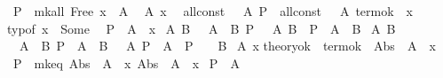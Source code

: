 {\begin{isabelle}
\isaindent{\ \ \ \ }{\isasymLongrightarrow}\ P\ {\isasymGamma}\ {\isacharparenleft}mk{\isacharunderscore}all\ {\isacharparenleft}Free\ x\ {\isasymtau}{\isacharparenright}\ A{\isacharparenright}{\isacharsemicolon}\isanewline
\isaindent{\ }{\isasymAnd}{\isasymGamma}\ {\isasymtau}\ A\ x{\isachardot}\isanewline
\isaindent{\ \ \ \ }{\isasymlbrakk}{\isasymTheta}{\isacharcomma}{\isasymGamma}\ {\isasymturnstile}\ all{\isacharunderscore}const\ {\isasymtau}\ {\isachardollar}\ A{\isacharsemicolon}\ P\ {\isasymGamma}\ {\isacharparenleft}all{\isacharunderscore}const\ {\isasymtau}\ {\isachardollar}\ A{\isacharparenright}{\isacharsemicolon}\ term{\isacharunderscore}ok\ {\isasymTheta}\ x{\isacharsemicolon}\isanewline
\isaindent{\ \ \ \ \ }typ{\isacharunderscore}of\ x\ {\isacharequal}\ Some\ {\isasymtau}{\isasymrbrakk}\isanewline
\isaindent{\ \ \ \ }{\isasymLongrightarrow}\ P\ {\isasymGamma}\ {\isacharparenleft}A\ {\isasymbullet}\ x{\isacharparenright}{\isacharsemicolon}\isanewline
\isaindent{\ }{\isasymAnd}{\isasymGamma}\ A\ B{\isachardot}\ {\isasymlbrakk}{\isasymTheta}{\isacharcomma}{\isasymGamma}\ {\isasymunion}\ {\isacharbraceleft}A{\isacharbraceright}\ {\isasymturnstile}\ B{\isacharsemicolon}\ P\ {\isacharparenleft}{\isasymGamma}\ {\isasymunion}\ {\isacharbraceleft}A{\isacharbraceright}{\isacharparenright}\ B{\isasymrbrakk}\ {\isasymLongrightarrow}\ P\ {\isasymGamma}\ {\isacharparenleft}A\ {\isasymlongmapsto}\ B{\isacharparenright}{\isacharsemicolon}\isanewline
\isaindent{\ }{\isasymAnd}{\isasymGamma}\ A\ B\ {\isasymGamma}\isanewline
\isaindent{\ \ \ \ }{\isasymlbrakk}{\isasymTheta}{\isacharcomma}{\isasymGamma}\ {\isasymturnstile}\ A\ {\isasymlongmapsto}\ B{\isacharsemicolon}\ P\ {\isasymGamma}\ {\isacharparenleft}A\ {\isasymlongmapsto}\ B{\isacharparenright}{\isacharsemicolon}\ {\isasymTheta}{\isacharcomma}{\isasymGamma}\ {\isasymturnstile}\ A{\isacharsemicolon}\ P\ {\isasymGamma}\ A{\isasymrbrakk}\ {\isasymLongrightarrow}\ P\ {\isacharparenleft}{\isasymGamma}\ {\isasymunion}\ {\isasymGamma}\ B{\isacharsemicolon}\isanewline
\isaindent{\ }{\isasymAnd}{\isasymtau}\ A\ x{\isachardot}\isanewline
\isaindent{\ \ \ \ }{\isasymlbrakk}theory{\isacharunderscore}ok\ {\isasymTheta}{\isacharsemicolon}\ term{\isacharunderscore}ok\ {\isasymTheta}\ {\isacharparenleft}Abs\ {\isasymtau}\ A\ {\isachardollar}\ x{\isacharparenright}{\isasymrbrakk}\isanewline
\isaindent{\ \ \ \ }{\isasymLongrightarrow}\ P\ {\isasymemptyset}\ {\isacharparenleft}mk{\isacharunderscore}eq\ {\isacharparenleft}Abs\ {\isasymtau}\ A\ {\isachardollar}\ x{\isacharparenright}\ {\isacharparenleft}Abs\ {\isasymtau}\ A\ {\isasymbullet}\ x{\isacharparenright}{\isacharparenright}{\isasymrbrakk}\isanewline
{\isasymLongrightarrow}\ P\ {\isasymGamma}\ A%
\end{isabelle}
}%
